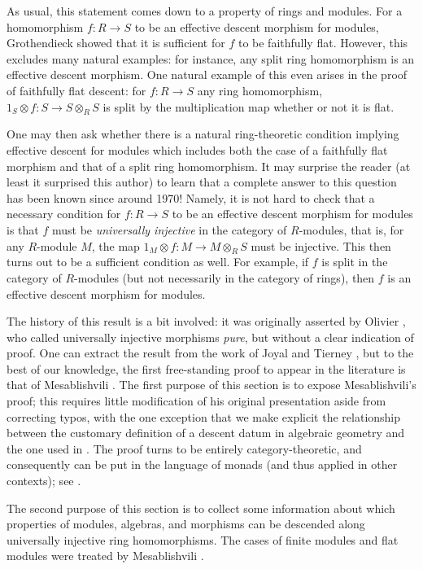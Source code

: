\medskip\noindent
As usual, this statement comes down to a property of rings and modules.
For a homomorphism $f: R \to S$ to be an effective descent morphism for
modules, Grothendieck showed that it is sufficient for $f$ to be
faithfully flat. However, this excludes many natural examples: for instance,
any split ring homomorphism is an effective descent morphism. One natural
example of this even arises in the proof of faithfully flat descent: for
$f: R \to S$ any ring homomorphism, $1_S \otimes f: S \to S \otimes_R S$
is split by the multiplication map whether or not it is flat.

\medskip\noindent
One may then ask whether there is a natural ring-theoretic condition 
implying effective descent for modules which includes both the case of a
faithfully flat morphism and that of a split ring homomorphism. It may
surprise the reader (at least it surprised this author) to learn that a
complete answer to this question has been known since around 1970! Namely,
it is not hard to check that a necessary condition for $f: R \to S$ to be
an effective descent morphism for modules is that $f$ must be
{\it universally injective} in the category of $R$-modules, that is, for
any $R$-module $M$, the map $1_M  \otimes f: M \to M \otimes_R S$
must be injective. This then turns out to be a sufficient condition as well.
For example, if $f$ is split in the category of $R$-modules (but not
necessarily in the category of rings), then $f$ is an effective descent
morphism for modules.
 
\medskip\noindent
The history of this result is a bit involved: it was originally asserted
by Olivier \cite{olivier}, who  called universally injective morphisms
{\it pure}, but without a clear indication of proof. One can extract the
result from the work of Joyal and Tierney \cite{joyal-tierney}, but to the
best of our knowledge, the first free-standing proof to appear in the
literature is that of Mesablishvili \cite{mesablishvili1}. The first purpose
of this section is to expose Mesablishvili's proof; this requires little
modification of his original presentation aside from correcting typos, with
the one exception that we make explicit the relationship between the
customary definition of a descent datum in algebraic geometry and the one
used in \cite{mesablishvili1}. The proof turns to be entirely
category-theoretic, and consequently can be put in the language of monads
(and thus applied in other contexts); see \cite{janelidze-tholen}.

\medskip\noindent
The second purpose of this section is to collect some information about which 
properties of modules, algebras, and morphisms can be descended along 
universally injective ring homomorphisms. The cases of finite modules
and flat modules were treated by Mesablishvili \cite{mesablishvili2}.


